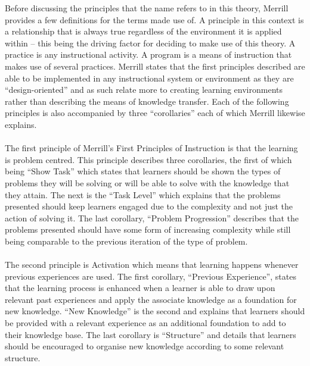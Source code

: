 \documentclass[conference]{IEEEtran}
\begin{document}
Before discussing the principles that the name refers to in this theory, Merrill\cite{Merrill2002} provides a few definitions for the terms made use of. A principle in this context is a relationship that is always true regardless of the environment it is applied within – this being the driving factor for deciding to make use of this theory\cite{Merrill2002}. A practice is any instructional activity\cite{Merrill2002}. A program is a means of instruction that makes use of several practices\cite{Merrill2002}. Merrill\cite{Merrill2002} states that the first principles described are able to be implemented in any instructional system or environment as they are “design-oriented” and as such relate more to creating learning environments rather than describing the means of knowledge transfer. Each of the following principles is also accompanied by three “corollaries” each of which Merrill\cite{Merrill2002} likewise explains.
\\\\
The first principle of Merrill’s First Principles of Instruction is that the learning is problem centred. This principle describes three corollaries, the first of which being “Show Task” which states that learners should be shown the types of problems they will be solving or will be able to solve with the knowledge that they attain\cite{Merrill2002}. The next is the “Task Level” which explains that the problems presented should keep learners engaged due to the complexity and not just the action of solving it\cite{Merrill2002}. The last corollary, “Problem Progression” describes that the problems presented should have some form of increasing complexity while still being comparable to the previous iteration of the type of problem\cite{Merrill2002}.
\\\\
The second principle is Activation which means that learning happens whenever previous experiences are used\cite{Merrill2002}. The first corollary, “Previous Experience”, states that the learning process is enhanced when a learner is able to draw upon relevant past experiences and apply the associate knowledge as a foundation for new knowledge\cite{Merrill2002}. “New Knowledge” is the second and explains that learners should be provided with a relevant experience as an additional foundation to add to their knowledge base\cite{Merrill2002}. The last corollary is “Structure” and details that learners should be encouraged to organise new knowledge according to some relevant structure\cite{Merrill2002}.
\\\\
\end{document}
